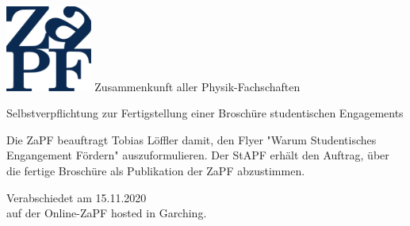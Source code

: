 \documentclass[DIV=calc]{scrartcl}
\begin{document}
  \hspace{0.87\textwidth}
  \begin{minipage}{120pt}
  	\vspace{-1.8cm}
  	\includegraphics[width=80pt]{../logo.pdf}
  	\centering
  	\small Zusammenkunft aller Physik-Fachschaften
  \end{minipage}
  \begin{center}
    \huge{Selbstverpflichtung zur Fertigstellung einer Broschüre studentischen Engagements}\vspace{.25\baselineskip}\\
  	\normalsize
  \end{center}
  \vspace{1cm}


Die ZaPF beauftragt Tobias Löffler damit, den Flyer "Warum Studentisches Engangement Fördern" auszuformulieren. 
Der StAPF erhält den Auftrag, über die fertige Broschüre als Publikation der ZaPF abzustimmen.

\vfill
    \begin{flushright}
      Verabschiedet am 15.11.2020 \\
      auf der Online-ZaPF hosted in Garching.
    \end{flushright}
\end{document}
